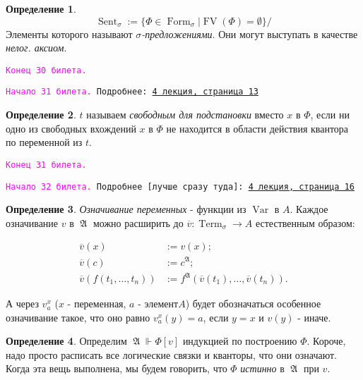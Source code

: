 \documentclass[a4paper,100pt]{article}
\theoremstyle{indented}
\theoremstyle{definition}
\newtheorem{defn}{Определение}
\theoremstyle{remark}
\DeclareMathOperator{\ra}{\rightarrow}
\DeclareMathOperator{\form}{Form}
\DeclareMathOperator{\Var}{Var}
\DeclareMathOperator{\Term}{Term}
\DeclareMathOperator{\FV}{FV}
\DeclareMathOperator{\Sent}{Sent}
\DeclareMathOperator{\GA}{\mathfrak{A}}
\begin{document}
\begin{defn}
  \[
    \Sent_\sigma := \{\Phi \in \form_\sigma | \FV (\Phi)=\emptyset\}/ 
  \]
  Элементы которого называют \textit{$\sigma$-предложениями}. Они могут выступать в качестве \textit{нелог. аксиом}.
\end{defn}

\texttt{\textcolor{magenta}{Конец 30 билета.}} 

\hrulefill

\texttt{\hypertarget{b31}{\textcolor{magenta}{Начало 31 билета.}} Подробнее: \href{http://www.mi-ras.ru/~speranski/courses/logic-1-2021-spring/slides_4.pdf}{4 лекция, страница 13}} 

\begin{defn}
  $t$ называем \textit{свободным для подстановки} вместо $x$ в $\Phi$, если ни одно из свободных вхождений $x$ в $\Phi$ не находится в области действия квантора по переменной из $t$. 
\end{defn}

\texttt{\textcolor{magenta}{Конец 31 билета.}} 

\hrulefill

\texttt{\hypertarget{b32}{\textcolor{magenta}{Начало 32 билета.}} Подробнее [лучше сразу туда]: \href{http://www.mi-ras.ru/~speranski/courses/logic-1-2021-spring/slides_4.pdf}{4 лекция, страница 16}} 

\begin{defn}
  \textit{Означивание переменных} - функции из $\Var$ в $A$. Каждое означивание $v$ в $\GA$ можно расширить до $\overline{v}:\Term_\sigma \ra A$ естественным образом: 

  \begin{equation*}
    \begin{aligned}
      \overline{v}(x) & := v(x); \\ 
      \overline{v}(c) & := c^{\GA}; \\
      \overline{v}(f(t_1, \ldots, t_n)) & := f^{\GA}(\overline{v}(t_1), \ldots, \overline{v}(t_n)).
    \end{aligned}
  \end{equation*}

  А через $v^x_a$  ($x$ - переменная, $a$ - элемент$A$) будет обозначаться особенное означивание такое, что оно равно $v^x_a(y)=a$, если $y=x$ и $v(y)$ - иначе.
\end{defn}

\begin{defn}
  Определим $\GA \Vdash \Phi[v]$ индукцией по построению $\Phi$. Короче, надо просто расписать все логические связки и кванторы, что они означают. Когда эта вещь выполнена, мы будем говорить, что $\Phi$ \textit{истинно} в $\GA$ при $v$. 
\end{defn}
\end{document}

